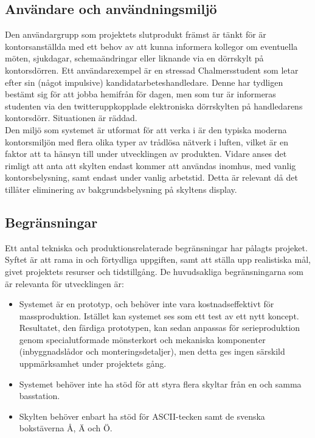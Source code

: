 \documentclass[a4paper,11pt]{article}
\begin{document}
\subsection{Användare och användningsmiljö}
Den användargrupp som projektets slutprodukt främst är tänkt för är kontorsanställda med ett behov av att kunna informera kollegor om eventuella möten, sjukdagar, schemaändringar eller liknande via en dörrskylt på kontorsdörren. Ett användarexempel är en stressad Chalmersstudent som letar efter sin (något impulsive) kandidatarbeteshandledare. Denne har tydligen bestämt sig för att jobba hemifrån för dagen, men som tur är informeras studenten via den twitteruppkopplade elektroniska dörrskylten på handledarens kontorsdörr. Situationen är räddad.\\

Den miljö som systemet är utformat för att verka i är den typiska moderna kontorsmiljön med flera olika typer av trådlösa nätverk i luften, vilket är en faktor att ta hänsyn till under utvecklingen av produkten. Vidare anses det rimligt att anta att skylten endast kommer att användas inomhus, med vanlig kontorsbelysning, samt endast under vanlig arbetstid. Detta är relevant då det tillåter eliminering av bakgrundsbelysning på skyltens display.

\subsection{Begränsningar}
Ett antal tekniska och produktionsrelaterade begränsningar har pålagts projeket. Syftet är att rama in och förtydliga uppgiften, samt att ställa upp realistiska mål, givet projektets resurser och tidstillgång. De huvudsakliga begränsningarna som är relevanta för utvecklingen är:
	\begin{itemize}
    	\item Systemet är en prototyp, och behöver inte vara kostnadseffektivt för massproduktion. Istället kan systemet ses som ett test av ett nytt koncept. Resultatet, den färdiga prototypen, kan sedan anpassas för serieproduktion genom specialutformade mönsterkort och mekaniska komponenter (inbyggnadslådor och monteringsdetaljer), men detta ges ingen särskild uppmärksamhet under projektets gång.
    	\item Systemet behöver inte ha stöd för att styra flera skyltar från en och samma basstation.
    	\item Skylten behöver enbart ha stöd för ASCII-tecken samt de svenska bokstäverna Å, Ä och Ö.
	\end{itemize}
	
\end{document}
